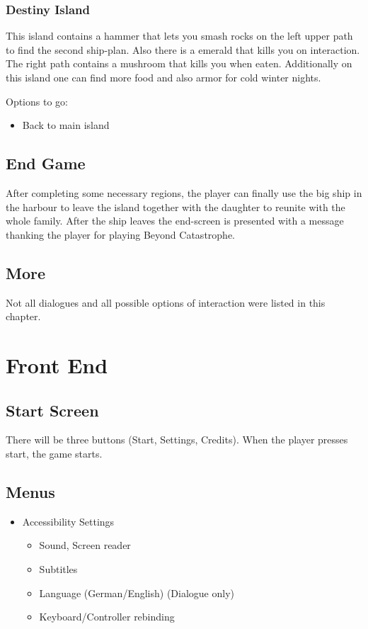 \documentclass[a4paper]{scrreprt}
\begin{document}
\subsection{Destiny Island}
\label{sec:destinyIsland}
This island contains a hammer that lets you smash rocks on the left upper path to find the second ship-plan. Also there is a emerald that kills you on interaction. The right path contains a mushroom that kills you when eaten. Additionally on this island one can find more food and also armor for cold winter nights. 

Options to go:
\begin{itemize}
    \item Back to main island
\end{itemize}

\section{End Game}
\label{sec:endgame}

After completing some necessary regions, the player can finally use the big ship in the harbour to leave the island together with the daughter to reunite with the whole family. After the ship leaves the end-screen is presented with a message thanking the player for playing Beyond Catastrophe.


\section{More}
\label{sec:more}
Not all dialogues and all possible options of interaction were listed in this chapter. 
  


\chapter{Front End}

\section{Start Screen}
There will be three buttons (Start, Settings, Credits). When the player presses start, the game starts.

\section{Menus}
\begin{itemize}
    \item Accessibility Settings
    \begin{itemize}
        \item Sound, Screen reader
        \item Subtitles
        \item Language (German/English) (Dialogue only)
        \item Keyboard/Controller rebinding
    \end{itemize}
\end{itemize}
\end{document}
